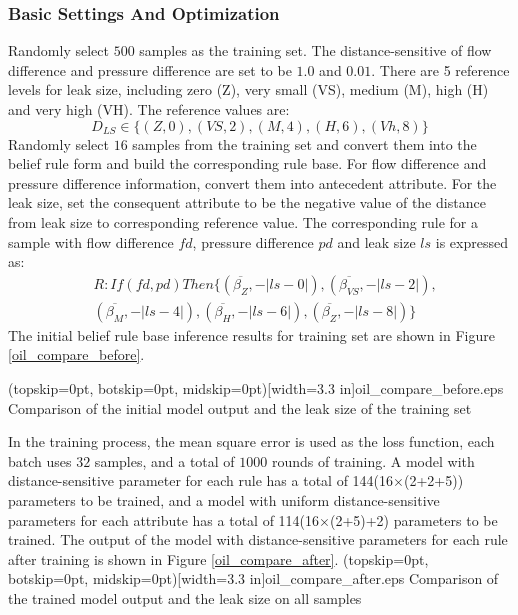 \documentclass{ieeeaccess}
\begin{document}
\subsubsection{Basic Settings And Optimization}
Randomly select $500$ samples as the training set.
The distance-sensitive of flow difference and pressure difference are set to be $1.0$ and $0.01$.
There are 5 reference levels for leak size, including zero (Z), very small (VS), medium (M), high (H) and very high (VH).
The reference values are:
\begin{equation}
    D_{LS}\in \{(Z,0),(VS,2),(M,4),(H,6),(Vh,8)\}
\end{equation}
Randomly select $16$ samples from the training set and convert them into the belief rule form and build the corresponding rule base.
For flow difference and pressure difference information, convert them into antecedent attribute.
For the leak size, set the consequent attribute to be the negative value of the distance from leak size to corresponding reference value.
The corresponding rule for a sample with flow difference $fd$, pressure difference $pd$ and leak size $ls$ is expressed as:
\begin{equation}
    \begin{split}
        &R:If(fd,pd)Then\{(\overline{\beta_{Z}},-|ls-0|),(\overline{\beta_{VS}},-|ls-2|),\\
        &(\overline{\beta_{M}},-|ls-4|),(\overline{\beta_{H}},-|ls-6|),(\overline{\beta_{Z}},-|ls-8|)\}
    \end{split}
\end{equation}
The initial belief rule base inference results for training set are shown in Figure \ref{oil_compare_before}.

\Figure[!t](topskip=0pt, botskip=0pt, midskip=0pt)[width=3.3 in]{oil_compare_before.eps}
{Comparison of the initial model output and the leak size of the training set\label{oil_compare_before}}

In the training process, the mean square error is used as the loss function, each batch uses $32$ samples, and a total of $1000$ rounds of training.
A model with distance-sensitive parameter for each rule has a total of 144(16$\times$(2+2+5)) parameters to be trained,
and a model with uniform distance-sensitive parameters for each attribute has a total of 114(16$\times$(2+5)+2) parameters to be trained.
The output of the model with distance-sensitive parameters for each rule after training is shown in Figure \ref{oil_compare_after}.
\Figure[!t](topskip=0pt, botskip=0pt, midskip=0pt)[width=3.3 in]{oil_compare_after.eps}
{Comparison of the trained model output and the leak size on all samples\label{oil_compare_after}}
\end{document}
